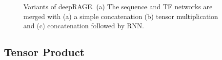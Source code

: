 \documentclass{article}
\begin{document}
\begin{figure}[!tbp]
  \centering
  \hfill
  \caption{Variants of deepRAGE. (a) The sequence and TF networks are merged with (a) a simple concatenation (b) tensor multiplication and (c) concatenation followed by RNN.}
\end{figure}


\subsection{Tensor Product}
\end{document}
